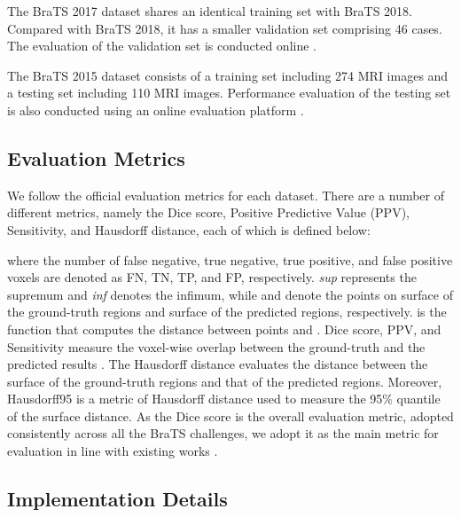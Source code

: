 \documentclass[journal,twoside]{IEEEtran}
\begin{document}
The BraTS 2017 dataset shares an identical training set with BraTS 2018. Compared with BraTS 2018, it has a smaller validation set comprising 46 cases. The evaluation of the validation set is conducted online \cite{CBICAIPP2015}.  


The BraTS 2015 dataset consists of a training set including 274 MRI images and a testing set including 110 MRI images. Performance evaluation of the testing set is also conducted using an online evaluation platform \cite{VirtualSkeleton2013}.




\subsection{Evaluation Metrics}
We follow the official evaluation metrics for each dataset. There are a number of different metrics, namely the Dice score, Positive Predictive Value (PPV), Sensitivity, and Hausdorff distance, each of which is defined below:
  
  
   
 
where the number of false negative, true negative, true positive, and false positive voxels are denoted as FN, TN, TP, and FP, respectively. \emph{sup} represents the supremum and \emph{inf} denotes the infimum, while  and  denote the points on surface  of the ground-truth regions and surface  of the predicted regions, respectively.  is the function that computes the distance between points  and . 
Dice score, PPV, and Sensitivity measure the voxel-wise overlap between the ground-truth and the predicted results \cite{menze2015multimodal}. The Hausdorff distance evaluates the  distance between the surface of the ground-truth regions and that of the predicted regions. Moreover, Hausdorff95 is a metric of Hausdorff distance used to measure the 95\% quantile of the surface distance. As the Dice score is the overall evaluation metric, adopted consistently across all the BraTS challenges, we adopt it as the main metric for evaluation in line with existing works \cite{pereira2016brain,havaei2017brain,zhao2018deep,kamnitsas2017efficient,kamnitsas2017ensembles,myronenko20183d,wang2017automatic,pereira2018adaptive,shen2017multi,shen2017boundary,bakas2018identifying,pereira2018adaptive,chen2018focus,isensee2018no}.





\subsection{Implementation Details}
\end{document}
